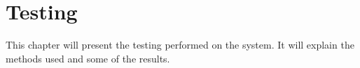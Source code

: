 \chapter{Testing}
This chapter will present the testing performed on the system. It will explain the methods used and some of the results.




